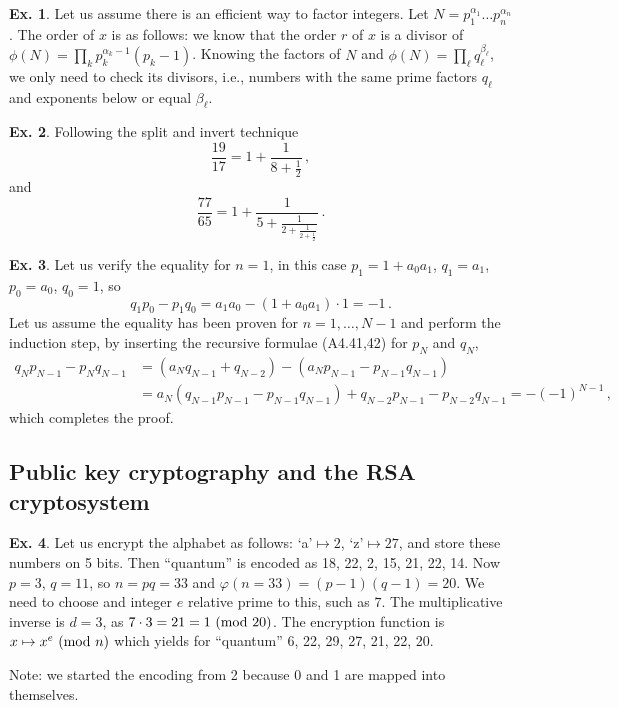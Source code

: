 \documentclass[a4paper,12pt]{article}
\theoremstyle{definition}
\newtheorem{exercise}{Ex.}[section]
\begin{document}
\begin{exercise}
 Let us assume there is an efficient way to factor integers. Let $N=p_1^{\alpha_1}\dots p_n^{\alpha_n}$. The order of $x$ is as follows: we know that the order $r$ of $x$ is a divisor of $\phi(N)=\prod_k p_k^{\alpha_k-1}(p_k-1)$. Knowing the factors of $N$ and $\phi(N)=\prod_\ell q_\ell^{\beta_\ell}$, we only need to check its divisors, i.e., numbers with the same prime factors $q_\ell$ and exponents below or equal $\beta_\ell$.
\end{exercise}

\begin{exercise}
 Following the split and invert technique
 \[
  \frac{19}{17}=1+\frac{1}{8+\frac{1}{2}}\,,
 \]
 and
 \[
  \frac{77}{65}=1+\frac{1}{5+\frac{1}{2+\frac{1}{2+\frac{1}{2}}}}\,.
 \]
\end{exercise}

\begin{exercise}
 Let us verify the equality for $n=1$, in this case $p_1=1+a_0 a_1$, $q_1=a_1$, $p_0=a_0$, $q_0=1$, so
 \[
  q_1p_0-p_1 q_0 = a_1 a_0 - (1+a_0 a_1)\cdot 1 = -1\,.
 \]
 Let us assume the equality has been proven for $n=1,\dots, N-1$ and perform the induction step, by inserting the recursive formulae (A4.41,42) for $p_N$ and $q_N$,
 \[
  \begin{aligned}
   q_N p_{N-1} -p_N q_{N-1} &= (a_N q_{N-1} + q_{N-2}) - (a_N p_{N-1}-p_{N-1}q_{N-1})\\ &= a_N(q_{N-1}p_{N-1}-p_{N-1}q_{N-1}) + q_{N-2}p_{N-1}-p_{N-2}q_{N-1} = -(-1)^{N-1}\,,
  \end{aligned}
 \]
 which completes the proof.
\end{exercise}


\subsection{Public key cryptography and the RSA cryptosystem}\label{app:RSA}

\begin{exercise}
 Let us encrypt the alphabet as follows: `a'$\mapsto 2$, `z'$\mapsto 27$, and store these numbers on 5 bits. Then ``quantum'' is encoded as 18, 22, 2, 15, 21, 22, 14. Now $p=3$, $q=11$, so $n=pq=33$ and $\varphi(n=33)=(p-1)(q-1)=20$. We need to choose and integer $e$ relative prime to this, such as $7$. The multiplicative inverse is $d=3$, as $7\cdot 3=21=1\ ({\rm mod\ }20)$. The encryption function is $x\mapsto x^{e}\ ({\rm mod\ }n)$ which yields for ``quantum'' 6, 22, 29, 27, 21, 22, 20. 
 
 Note: we started the encoding from 2 because 0 and 1 are mapped into themselves.
\end{exercise}
\end{document}

